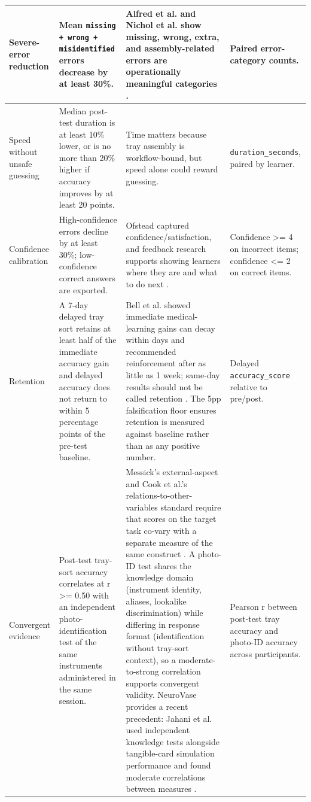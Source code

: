 \documentclass[10pt,a4paper]{article}
\begin{document}
\begin{table}[H]
\begin{tabularx}{\textwidth}{|>{\raggedright\arraybackslash}X|>{\raggedright\arraybackslash}X|>{\raggedright\arraybackslash}X|>{\raggedright\arraybackslash}X|}
\hline
Severe-error reduction & Mean \texttt{missing + wrong + misidentified} errors decrease by at least 30\%. & Alfred et al. and Nichol et al. show missing, wrong, extra, and assembly-related errors are operationally meaningful categories \cite{alfred-et-al-2021, nichol-et-al-2024}. & Paired error-category counts. \\
\hline
Speed without unsafe guessing & Median post-test duration is at least 10\% lower, or is no more than 20\% higher if accuracy improves by at least 20 points. & Time matters because tray assembly is workflow-bound, but speed alone could reward guessing. & \texttt{duration\_seconds}, paired by learner. \\
\hline
Confidence calibration & High-confidence errors decline by at least 30\%; low-confidence correct answers are exported. & Ofstead captured confidence/satisfaction, and feedback research supports showing learners where they are and what to do next \cite{ofstead-et-al-2023, hattie-and-timperley-2007}. & Confidence >= 4 on incorrect items; confidence <= 2 on correct items. \\
\hline
Retention & A 7-day delayed tray sort retains at least half of the immediate accuracy gain and delayed accuracy does not return to within 5 percentage points of the pre-test baseline. & Bell et al. showed immediate medical-learning gains can decay within days and recommended reinforcement after as little as 1 week; same-day results should not be called retention \cite{bell-et-al-2008}. The 5pp falsification floor ensures retention is measured against baseline rather than as any positive number. & Delayed \texttt{accuracy\_score} relative to pre/post. \\
\hline
Convergent evidence & Post-test tray-sort accuracy correlates at r >= 0.50 with an independent photo-identification test of the same instruments administered in the same session. & Messick's external-aspect and Cook et al.'s relations-to-other-variables standard require that scores on the target task co-vary with a separate measure of the same construct \cite{messick-validity-1989, cook-beckman-validity-2006}. A photo-ID test shares the knowledge domain (instrument identity, aliases, lookalike discrimination) while differing in response format (identification without tray-sort context), so a moderate-to-strong correlation supports convergent validity. NeuroVase provides a recent precedent: Jahani et al. used independent knowledge tests alongside tangible-card simulation performance and found moderate correlations between measures \cite{jahani-et-al-2026-neurovase}. & Pearson r between post-test tray accuracy and photo-ID accuracy across participants. \\

\end{tabularx}
\end{table}
\end{document}
